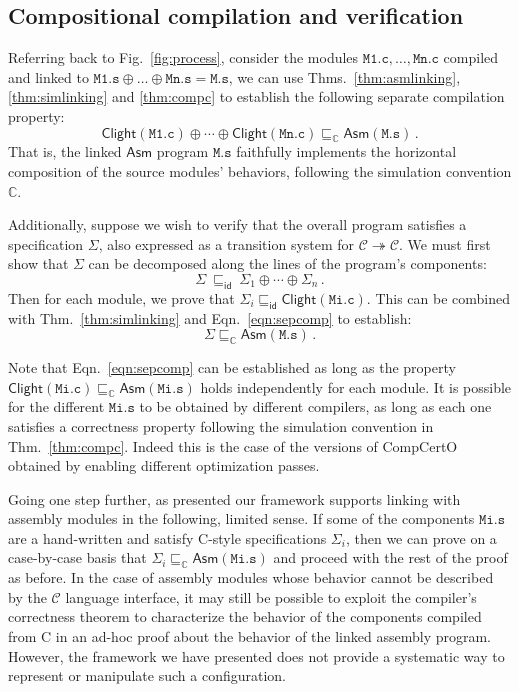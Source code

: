 \documentclass[sigplan,10pt,review,anonymous]{acmart}\settopmatter{printfolios=true,printccs=false,printacmref=false}
\newcommand{\kw}[1]{\ensuremath{ \mathsf{#1} }}
\begin{document}

\subsection{Compositional compilation and verification} \label{sec:cver} %

Referring back to Fig.~\ref{fig:process},
consider the modules
$\mathtt{M1.c}, \ldots, \mathtt{Mn.c}$
compiled and linked to
$\mathtt{M1.s} \oplus \ldots \oplus \mathtt{Mn.s} = \mathtt{M.s}$,
we can use
Thms.~\ref{thm:asmlinking},
\ref{thm:simlinking} and
\ref{thm:compc}
to establish the following separate compilation property:
\begin{equation}
  \label{eqn:sepcomp}
  \kw{Clight}(\mathtt{M1.c}) \oplus \cdots \oplus \kw{Clight}(\mathtt{Mn.c})
  \sqsubseteq_\mathbb{C}
  \kw{Asm}(\mathtt{M.s}) \,.
\end{equation}
That is,
the linked \kw{Asm} program
$\mathtt{M.s}$
faithfully implements
the horizontal composition of the source modules' behaviors,
following the simulation convention $\mathbb{C}$.

Additionally,
suppose we wish to verify that the overall program
satisfies a specification $\Sigma$,
also expressed as a transition system
for $\mathcal{C} \twoheadrightarrow \mathcal{C}$.
We must first show that $\Sigma$ can be decomposed
along the lines of the program's components:
\[
    \Sigma \: \sqsubseteq_\kw{id} \:
    \Sigma_1 \oplus \cdots \oplus \Sigma_n \,.
\]
Then for each module, we prove that
$\Sigma_i \sqsubseteq_\kw{id} \kw{Clight}(\mathtt{Mi.c})$.
This can be combined with Thm.~\ref{thm:simlinking} and Eqn.~\ref{eqn:sepcomp}
to establish:
\[
    \Sigma \sqsubseteq_\mathbb{C} \kw{Asm}(\mathtt{M.s}) \,.
\]

Note that Eqn.~\ref{eqn:sepcomp} can be established
as long as the property
$\kw{Clight}(\mathtt{Mi.c}) \sqsubseteq_\mathbb{C}
 \kw{Asm}(\mathtt{Mi.s})$
holds independently for each module.
It is possible for the different $\mathtt{Mi.s}$
to be obtained by different compilers,
as long as each one satisfies a correctness property
following the simulation convention in Thm.~\ref{thm:compc}.
Indeed this is the case of the versions of CompCertO
obtained by enabling different optimization passes.

Going one step further,
as presented our framework supports linking
with assembly modules in the following, limited sense.
If some of the components $\mathtt{Mi.s}$
are a hand-written and
satisfy C-style specifications $\Sigma_i$,
then we can prove on a case-by-case basis that
$\Sigma_i \sqsubseteq_\mathbb{C} \kw{Asm}(\mathtt{Mi.s})$
and proceed with the rest of the proof as before.
In the case of assembly modules
whose behavior cannot be described
by the $\mathcal{C}$ language interface,
it may still be possible to exploit the compiler's
correctness theorem
to characterize the behavior of the components
compiled from C
in an ad-hoc proof about the behavior of the linked
assembly program.
However, the framework we have presented
does not provide a systematic way
to represent or manipulate
such a configuration.
\end{document}
